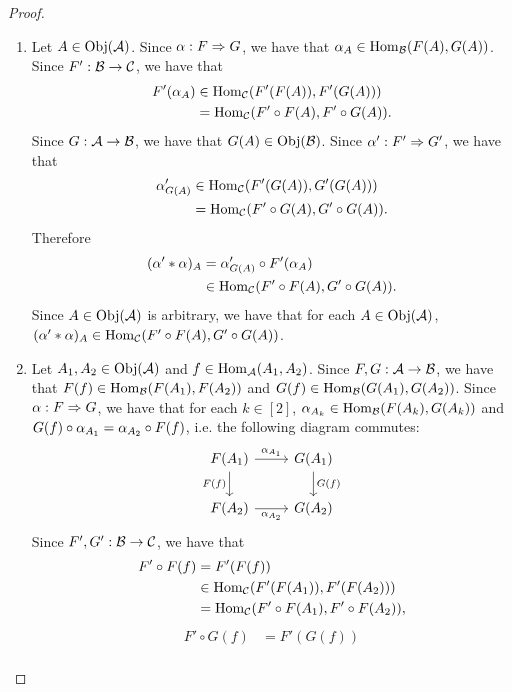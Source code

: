 \documentclass{book}
\begin{document}
	\begin{proof}\
		\begin{enumerate}
			\item Let $A \in \operatorname{Obj}(\mathcal{A})$. Since $\alpha: F \Rightarrow G$, we have that $\alpha_A \in \operatorname{Hom}_{\mathcal{B}}(F(A), G(A))$. Since $F':\mathcal{B} \rightarrow \mathcal{C}$, we have that 
			\begin{align*}
				F'(\alpha_A) 
				& \in \operatorname{Hom}_{\mathcal{C}}(F'(F(A)), F'(G(A))) \\
				& = \operatorname{Hom}_{\mathcal{C}}(F' \circ F(A), F' \circ G(A)).
			\end{align*}
			Since $G:\mathcal{A} \rightarrow \mathcal{B}$, we have that $G(A) \in \operatorname{Obj}(\mathcal{B})$. Since $\alpha':F' \Rightarrow G'$, we have that  
			\begin{align*}
				\alpha'_{G(A)} 
				& \in \operatorname{Hom}_{\mathcal{C}}(F'(G(A)), G'(G(A))) \\
				& = \operatorname{Hom}_{\mathcal{C}}(F' \circ G(A), G' \circ G(A)). 
			\end{align*}
			Therefore 
			\begin{align*}
				(\alpha' * \alpha)_A 
				& = \alpha'_{G(A)} \circ F' (\alpha_A) \\
				& \in \operatorname{Hom}_{\mathcal{C}}(F' \circ F(A), G' \circ G(A)).
			\end{align*}
			Since $A \in \operatorname{Obj}(\mathcal{A})$ is arbitrary, we have that for each $A \in \operatorname{Obj}(\mathcal{A})$, $(\alpha' * \alpha)_A \in \operatorname{Hom}_{\mathcal{C}}(F' \circ F(A), G' \circ G(A))$.
			\item Let $A_1, A_2 \in \operatorname{Obj}(\mathcal{A})$ and $f \in \operatorname{Hom}_{\mathcal{A}}(A_1, A_2)$. Since $F,G:\mathcal{A} \rightarrow \mathcal{B}$, we have that $F(f) \in \operatorname{Hom}_{\mathcal{B}}(F(A_1), F(A_2))$ and $G(f) \in \operatorname{Hom}_{\mathcal{B}}(G(A_1), G(A_2))$. Since $\alpha: F \Rightarrow G$, we have that for each $k \in [2]$, $\alpha_{A_k} \in \operatorname{Hom}_{\mathcal{B}}(F(A_k), G(A_k))$ and $G(f) \circ \alpha_{A_1} = \alpha_{A_2} \circ F(f)$, i.e. the following diagram commutes: 
			\[ 
			\begin{tikzcd}
				F(A_1)  \arrow[r, "\al_{A_1}"]  \arrow[d, "F(f)"']  & G(A_1)   \arrow[d, "G(f)"]\\
				F(A_2) \arrow[r, "\al_{A_2}"'] &  G(A_2) 
			\end{tikzcd}
			\]
			Since $F',G': \mathcal{B} \rightarrow \mathcal{C}$, we have that 
			\begin{align*}
				F' \circ F(f)
				& = F'(F(f)) \\
				& \in \operatorname{Hom}_{\mathcal{C}}(F'(F(A_1)), F'(F(A_2))) \\
				& = \operatorname{Hom}_{\mathcal{C}}(F' \circ F(A_1), F' \circ F(A_2)),
			\end{align*}
			\begin{align*}
				F' \circ G(f)
				& = F'(G(f)) \\

\end{align*}
\end{enumerate}
\end{proof}
\end{document}
